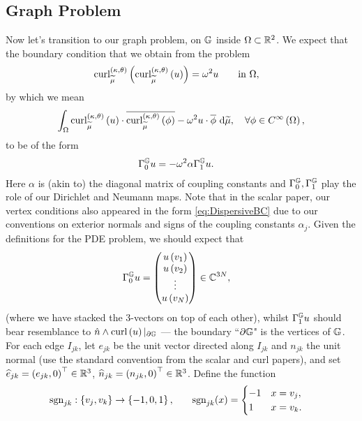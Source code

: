 \documentclass[11pt]{report}
\renewcommand{\curl}[1]{\mathrm{curl}\bracs{#1}}
\newcommand{\ktdcurl}[2]{\mathrm{curl}^{\kt}_{#1}\bracs{#2}}
\newcommand{\dgmap}{\dmap^{\graph}}
\newcommand{\ngmap}{\nmap^{\graph}}
\newcommand{\sgn}{\mathrm{sgn}}
\begin{document}
\subsection*{Graph Problem}
Now let's transition to our graph problem, on $\mathbb{G}$ inside $\Omega\subset\mathbb{R}^2$.
We expect that the boundary condition that we obtain from the problem
\begin{align} \label{eq:SingStrucCurlCurl}
	\ktdcurl{\dddmes}{\ktdcurl{\dddmes}{u}} &= \omega^2 u \qquad\text{in } \ddom,
\end{align}
by which we mean
\begin{align*}
	\integral{\ddom}{ \ktdcurl{\dddmes}{u}\cdot\overline{\ktdcurl{\dddmes}{\phi}} -\omega^2 u\cdot\overline{\phi} }{\dddmes},
	\quad\forall\phi\in\smooth{\ddom},
\end{align*}
to be of the form
\begin{align} \label{eq:DispersiveBC}
	\dgmap u &= -\omega^2 \alpha \ngmap u.
\end{align}
Here $\alpha$ is (akin to) the diagonal matrix of coupling constants and $\dgmap, \ngmap$ play the role of our Dirichlet and Neumann maps.
Note that in the scalar paper, our vertex conditions also appeared in the form \eqref{eq:DispersiveBC} due to our conventions on exterior normals and signs of the coupling constants $\alpha_j$.
Given the definitions for the PDE problem, we should expect that
\begin{align} \label{eq:DGMapDef}
	\dgmap u &= 
	\begin{pmatrix}
		u\bracs{v_1} \\ u\bracs{v_2} \\ \vdots \\ u\bracs{v_N}
	\end{pmatrix}
	\in\complex^{3N},
\end{align}
(where we have stacked the 3-vectors on top of each other), whilst $\ngmap u$ should bear resemblance to $\hat{n}\wedge\curl{u}\vert_{\partial\graph}$ --- the boundary ``$\partial\mathbb{G}$" is the vertices of $\mathbb{G}$.
For each edge $I_{jk}$, let $e_{jk}$ be the unit vector directed along $I_{jk}$ and $n_{jk}$ the unit normal (use the standard convention from the scalar and curl papers), and set $\widehat{e}_{jk} = \left( e_{jk}, 0 \right)^\top\in\mathbb{R}^3$, $\widehat{n}_{jk} = \left( n_{jk}, 0 \right)^\top\in\mathbb{R}^3$.
Define the function
\begin{align*}
	\sgn_{jk}: \clbracs{v_j, v_k} \rightarrow \clbracs{-1,0,1}, 
	&\qquad
	\sgn_{jk}(x) = \begin{cases} -1 & x=v_j, \\ 1 & x=v_k. \end{cases}
\end{align*}
\end{document}
